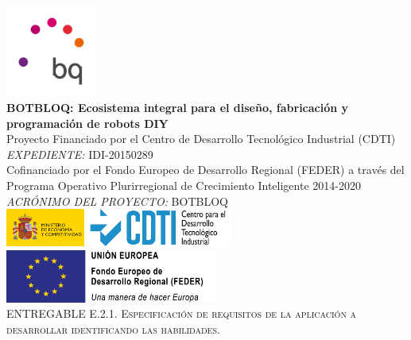 \documentclass[12pt]{article} %
\begin{document}

\begin{titlepage}

\newcommand{\HRule}{\rule{\linewidth}{0.5mm}} %

\center %

\includegraphics[width=3cm]{logo}\\[1.0cm]

{ \huge \bfseries BOTBLOQ: Ecosistema integral para el diseño, fabricación y programación de robots DIY}\\[0.5cm] %

\textsc Proyecto Financiado por el Centro de Desarrollo Tecnológico Industrial (CDTI) \\
\textsc{\small \emph{EXPEDIENTE:} IDI-20150289} \\
\textsc Cofinanciado por el Fondo Europeo de Desarrollo Regional (FEDER) a través del Programa Operativo Plurirregional de Crecimiento Inteligente 2014-2020 \\[0.5cm]
{\small \emph{ACRÓNIMO DEL PROYECTO:} BOTBLOQ}\\[0.5cm] %

\includegraphics[width=7.5cm]{CDTI}
\includegraphics[width=7cm]{FEDER}\\[1.0cm]

\textsc{\Large ENTREGABLE E.2.1. Especificación de requisitos de la aplicación a desarrollar identificando las habilidades.}\\[0.5cm] %


\end{titlepage}
\end{document}

